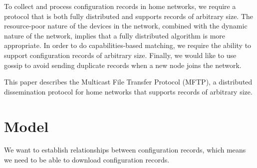 \documentclass[letterpaper]{article}
\begin{document}
To collect and process configuration records in home networks, we require a protocol that is both fully distributed and supports records of arbitrary size.
The resource-poor nature of the devices in the network, combined with the dynamic nature of the network, implies that a fully distributed algorithm is more appropriate.
In order to do capabilities-based matching, we require the ability to support configuration records of arbitrary size.
Finally, we would like to use gossip to avoid sending duplicate records when a new node joins the network.

This paper describes the Multicast File Transfer Protocol (MFTP), a distributed dissemination protocol for home networks that supports records of arbitrary size.


\section{Model\label{model}}

We want to establish relationships between configuration records, which means we need to be able to download configuration records.


\end{document}
